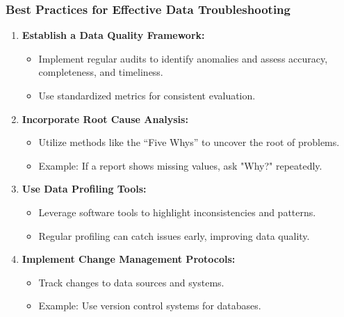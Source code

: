 \documentclass{beamer}
\begin{document}
\begin{frame}[fragile]
    \frametitle{Best Practices for Effective Data Troubleshooting}
    
    \begin{enumerate}
        \item \textbf{Establish a Data Quality Framework:}
        \begin{itemize}
            \item Implement regular audits to identify anomalies and assess accuracy, completeness, and timeliness.
            \item Use standardized metrics for consistent evaluation.
        \end{itemize}
        
        \item \textbf{Incorporate Root Cause Analysis:}
        \begin{itemize}
            \item Utilize methods like the “Five Whys” to uncover the root of problems.
            \item Example: If a report shows missing values, ask "Why?" repeatedly.
        \end{itemize}

        \item \textbf{Use Data Profiling Tools:}
        \begin{itemize}
            \item Leverage software tools to highlight inconsistencies and patterns.
            \item Regular profiling can catch issues early, improving data quality.
        \end{itemize}
        
        \item \textbf{Implement Change Management Protocols:}
        \begin{itemize}
            \item Track changes to data sources and systems.
            \item Example: Use version control systems for databases.
        \end{itemize}
    \end{enumerate}
\end{frame}
\end{document}
